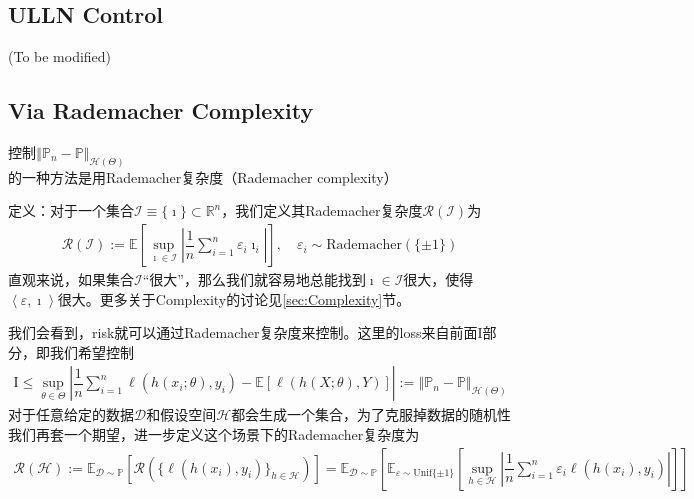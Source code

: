 \documentclass[11pt,a4paper]{ctexart}
\numberwithin{equation}{section}%
\begin{document}
\subsection{ULLN Control}

(To be modified)

\subsection{Via Rademacher Complexity}\label{sec:Rademacher}

控制$ \left\Vert \mathbb{P}_n-\mathbb{P} \right\Vert _{\mathcal{H}(\Theta)}  $的一种方法是用Rademacher复杂度（Rademacher complexity）

定义：对于一个集合$\mathcal{I}\equiv \{\imath \}\subset \mathbb{R}^n$，我们定义其Rademacher复杂度$ \mathcal{R}(\mathcal{I}) $为
\begin{align*}
    \mathcal{R}(\mathcal{I}) := \mathbb{E}\left[ \sup_{\imath \in \mathcal{I}} \left\vert \dfrac{ 1 }{ n } \sum_{i=1}^n \varepsilon_i \imath_i \right\vert  \right],\quad \varepsilon_i\sim \text{Rademacher}(\{\pm 1\})
\end{align*}
直观来说，如果集合$ \mathcal{I} $“很大”，那么我们就容易地总能找到$ \imath\in \mathcal{I} $很大，使得$ \left\langle \varepsilon ,\imath \right\rangle  $很大。更多关于Complexity的讨论见\ref{sec:Complexity}节。

我们会看到，risk就可以通过Rademacher复杂度来控制。这里的loss来自前面$ \mathrm{I} $部分，即我们希望控制
\begin{align*}
    \text{I}\leq \sup_{\theta \in \Theta} \left\vert  \dfrac{ 1 }{ n  } \sum_{i=1}^n \ell ( h(x_i;\theta ), y_i ) - \mathbb{E}\left[ \ell ( h(X;\theta ), Y ) \right]  \right\vert := \left\Vert \mathbb{P}_n-\mathbb{P} \right\Vert _{\mathcal{H}(\Theta)} 
\end{align*}
对于任意给定的数据$ \mathcal{D} $和假设空间$ \mathcal{H} $都会生成一个集合，为了克服掉数据的随机性我们再套一个期望，进一步定义这个场景下的Rademacher复杂度为
\begin{align*}
    \mathcal{R}(\mathcal{H}):= \mathbb{E}_{\mathcal{D}\sim \mathbb{P}}\left[ \mathcal{R}(\{\ell(h(x_i),y_i)\}_{h\in\mathcal{H}}) \right]  = \mathbb{E}_{\mathcal{D}\sim \mathbb{P}}\left[ \mathbb{E}_{\varepsilon\sim \mathrm{ Unif }\{\pm 1\} }\left[ \sup_{h\in\mathcal{H}} \left\vert  \dfrac{ 1 }{ n }\sum_{i=1}^n \varepsilon_i \ell(h(x_i),y_i) \right\vert  \right]  \right]
\end{align*}
\end{document}
